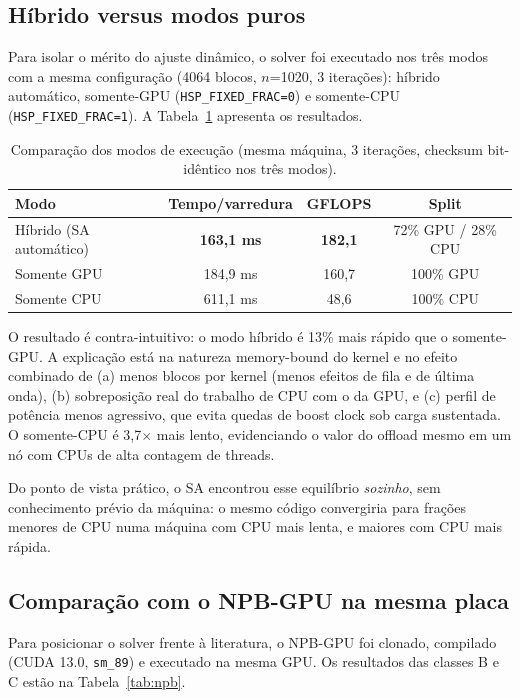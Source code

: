 \documentclass[12pt]{article}
\begin{document}
\subsection{Híbrido versus modos puros}

Para isolar o mérito do ajuste dinâmico, o solver foi executado nos três
modos com a mesma configuração (4064 blocos, $n$=1020, 3 iterações):
híbrido automático, somente-GPU (\texttt{HSP\_FIXED\_FRAC=0}) e
somente-CPU (\texttt{HSP\_FIXED\_FRAC=1}). A
Tabela~\ref{tab:modos} apresenta os resultados.

\begin{table}[ht]
\centering
\caption{Comparação dos modos de execução (mesma máquina, 3 iterações,
  checksum bit-idêntico nos três modos).}
\label{tab:modos}
\begin{tabular}{lccc}
\toprule
\textbf{Modo} & \textbf{Tempo/varredura} & \textbf{GFLOPS} & \textbf{Split} \\
\midrule
Híbrido (SA automático) & \textbf{163,1 ms} & \textbf{182,1} & 72\% GPU / 28\% CPU \\
Somente GPU & 184,9 ms & 160,7 & 100\% GPU \\
Somente CPU & 611,1 ms & 48,6 & 100\% CPU \\
\bottomrule
\end{tabular}
\end{table}



O resultado é contra-intuitivo: o modo híbrido é 13\% mais rápido que o
somente-GPU. A explicação está na natureza memory-bound do kernel e no
efeito combinado de (a) menos blocos por kernel (menos efeitos de fila e de
última onda), (b) sobreposição real do trabalho de CPU com o da GPU, e (c)
perfil de potência menos agressivo, que evita quedas de boost clock sob
carga sustentada. O somente-CPU é 3,7$\times$ mais lento, evidenciando o
valor do offload mesmo em um nó com CPUs de alta contagem de threads.

Do ponto de vista prático, o SA encontrou esse equilíbrio \emph{sozinho},
sem conhecimento prévio da máquina: o mesmo código convergiria para frações
menores de CPU numa máquina com CPU mais lenta, e maiores com CPU mais
rápida.

\subsection{Comparação com o NPB-GPU na mesma placa}

Para posicionar o solver frente à literatura, o NPB-GPU \cite{araujo:2021}
foi clonado, compilado (CUDA 13.0, \texttt{sm\_89}) e executado na mesma
GPU. Os resultados das classes B e C estão na
Tabela~\ref{tab:npb}.
\end{document}
